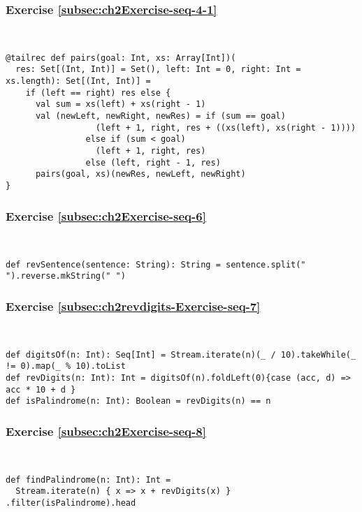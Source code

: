 \subsubsection*{Exercise \ref{subsec:ch2Exercise-seq-4-1}}

~
\begin{lstlisting}
@tailrec def pairs(goal: Int, xs: Array[Int])(
  res: Set[(Int, Int)] = Set(), left: Int = 0, right: Int = xs.length): Set[(Int, Int)] =
    if (left == right) res else {
      val sum = xs(left) + xs(right - 1)
      val (newLeft, newRight, newRes) = if (sum == goal) 
                  (left + 1, right, res + ((xs(left), xs(right - 1)))) 
                else if (sum < goal)
                  (left + 1, right, res)
                else (left, right - 1, res)
      pairs(goal, xs)(newRes, newLeft, newRight)
}
\end{lstlisting}


\subsubsection*{Exercise \ref{subsec:ch2Exercise-seq-6}}

~
\begin{lstlisting}
def revSentence(sentence: String): String = sentence.split(" ").reverse.mkString(" ")
\end{lstlisting}


\subsubsection*{Exercise \ref{subsec:ch2revdigits-Exercise-seq-7}}

~
\begin{lstlisting}
def digitsOf(n: Int): Seq[Int] = Stream.iterate(n)(_ / 10).takeWhile(_ != 0).map(_ % 10).toList
def revDigits(n: Int): Int = digitsOf(n).foldLeft(0){case (acc, d) => acc * 10 + d }
def isPalindrome(n: Int): Boolean = revDigits(n) == n
\end{lstlisting}


\subsubsection*{Exercise \ref{subsec:ch2Exercise-seq-8}}

~
\begin{lstlisting}
def findPalindrome(n: Int): Int = 
  Stream.iterate(n) { x => x + revDigits(x) } .filter(isPalindrome).head
\end{lstlisting}


